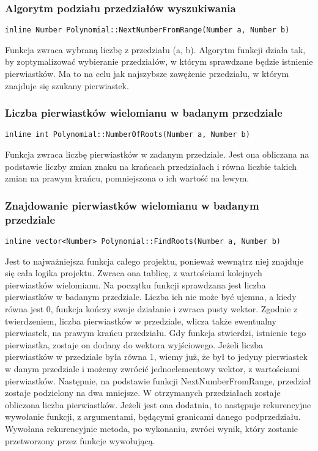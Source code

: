 \documentclass[twoside,a4paper]{book}
\begin{document}
\subsubsection{Algorytm podziału przedziałów wyszukiwania}
\begin{lstlisting}
inline Number Polynomial::NextNumberFromRange(Number a, Number b)
\end{lstlisting}
Funkcja zwraca wybraną liczbę z przedziału (a, b). Algorytm funkcji działa tak, by zoptymalizować wybieranie przedziałów, w którym sprawdzane będzie istnienie pierwiastków. Ma to na celu jak najszybsze zawężenie przedziału, w którym znajduje się szukany pierwiastek.

\subsubsection{Liczba pierwiastków wielomianu w badanym przedziale}
\begin{lstlisting}
inline int Polynomial::NumberOfRoots(Number a, Number b)
\end{lstlisting}
Funkcja zwraca liczbę pierwiastków w zadanym przedziale. Jest ona obliczana na podstawie liczby zmian znaku na krańcach przedziałach i równa liczbie takich zmian na prawym krańcu, pomniejszona o ich wartość na lewym.

\subsubsection{Znajdowanie pierwiastków wielomianu w badanym przedziale}
\begin{lstlisting}
inline vector<Number> Polynomial::FindRoots(Number a, Number b)
\end{lstlisting}
Jest to najważniejsza funkcja całego projektu, ponieważ wewnątrz niej znajduje się cała logika projektu. Zwraca ona tablicę, z wartościami kolejnych pierwiastków wielomianu.  Na początku funkcji sprawdzana jest liczba pierwiastków w badanym przedziale. Liczba ich nie może być ujemna, a kiedy równa jest 0, funkcja kończy swoje działanie i zwraca pusty wektor.
Zgodnie z twierdzeniem, liczba pierwiastków w przedziale, wlicza także ewentualny pierwiastek, na prawym krańcu przedziału. Gdy funkcja stwierdzi, istnienie tego pierwiastka, zostaje on dodany do wektora wyjściowego. Jeżeli liczba pierwiastków w przedziale była równa 1, wiemy już, że był to jedyny pierwiastek w danym przedziale i możemy zwrócić jednoelementowy wektor, z wartościami pierwiastków.
Następnie, na podstawie funkcji NextNumberFromRange, przedział zostaje podzielony na dwa mniejsze. W otrzymanych przedziałach zostaje obliczona liczba pierwiastków. Jeżeli jest ona dodatnia, to następuje rekurencyjne wywołanie funkcji, z argumentami, będącymi granicami danego podprzedziału. Wywołana rekurencyjnie metoda, po wykonaniu, zwróci wynik, który zostanie przetworzony przez funkcje wywołującą. 
\end{document}
